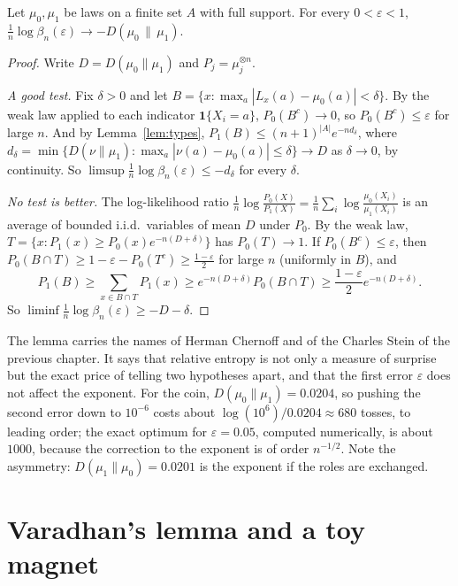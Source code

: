 \begin{theorem}\label{thm:chernoffstein}
Let $\mu_0,\mu_1$ be laws on a finite set $A$ with full support. For every $0<\varepsilon<1$, $\displaystyle\frac1n\log\beta_n(\varepsilon)\to-D(\mu_0\,\|\,\mu_1)$.
\end{theorem}
\begin{proof}
Write $D=D(\mu_0\|\mu_1)$ and $P_j=\mu_j^{\otimes n}$.

\emph{A good test.} Fix $\delta>0$ and let $B=\{x:\max_a|L_x(a)-\mu_0(a)|<\delta\}$. By the weak law applied to each indicator $\mathbf 1\{X_i=a\}$, $P_0(B^c)\to0$, so $P_0(B^c)\le\varepsilon$ for
large $n$. And by Lemma~\ref{lem:types}, $P_1(B)\le(n+1)^{|A|}e^{-nd_\delta}$, where $d_\delta=\min\{D(\nu\|\mu_1):\max_a|\nu(a)-\mu_0(a)|\le\delta\}\to D$ as $\delta\to0$, by continuity. So
$\limsup\frac1n\log\beta_n(\varepsilon)\le-d_\delta$ for every $\delta$.

\emph{No test is better.} The log-likelihood ratio $\frac1n\log\frac{P_0(X)}{P_1(X)}=\frac1n\sum_i\log\frac{\mu_0(X_i)}{\mu_1(X_i)}$ is an average of bounded i.i.d.\ variables of mean $D$ under $P_0$.
By the weak law, $T=\{x:P_1(x)\ge P_0(x)e^{-n(D+\delta)}\}$ has $P_0(T)\to1$. If $P_0(B^c)\le\varepsilon$, then $P_0(B\cap T)\ge1-\varepsilon-P_0(T^c)\ge\frac{1-\varepsilon}2$ for large $n$ (uniformly in $B$), and
\[
P_1(B)\ge\sum_{x\in B\cap T}P_1(x)\ge e^{-n(D+\delta)}P_0(B\cap T)\ge\frac{1-\varepsilon}2e^{-n(D+\delta)}.
\]
So $\liminf\frac1n\log\beta_n(\varepsilon)\ge-D-\delta$.
\end{proof}

The lemma carries the names of Herman Chernoff and of the Charles Stein of the previous chapter. It says that relative entropy is not only a measure of surprise but the
exact price of telling two hypotheses apart, and that the first error $\varepsilon$ does not affect the exponent. For the coin, $D(\mu_0\|\mu_1)=0.0204$, so pushing the second error
down to $10^{-6}$ costs about $\log(10^6)/0.0204\approx680$ tosses, to leading order; the exact optimum for $\varepsilon=0.05$, computed numerically, is about $1000$, because
the correction to the exponent is of order $n^{-1/2}$. Note the asymmetry: $D(\mu_1\|\mu_0)=0.0201$ is the exponent if the roles are exchanged.

\section{Varadhan's lemma and a toy magnet}

